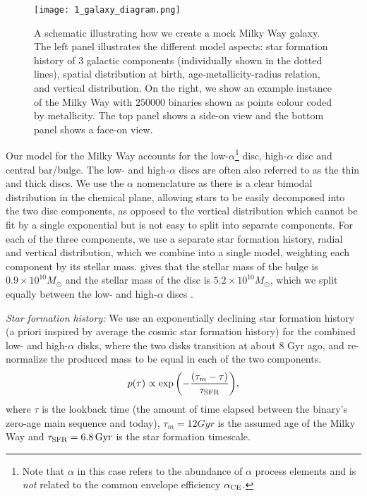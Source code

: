 \begin{figure*}[t]
    \centering
    \texttt{[image: 1\_galaxy\_diagram.png]}
    \caption{A schematic illustrating how we create a mock Milky Way galaxy. The left panel illustrates the different model aspects: star formation history of 3 galactic components (individually shown in the dotted lines), spatial distribution at birth, age-metallicity-radius relation, and vertical distribution.
    On the right, we show an example instance of the Milky Way with $250000$ binaries shown as points colour coded by metallicity. The top panel shows a side-on view and the bottom panel shows a face-on view.}
    \label{fig:galaxy_schematic}
\end{figure*}

Our model for the Milky Way accounts for the low-$\alpha$\footnote{Note that $\alpha$ in this case refers to the abundance of $\alpha$ process elements and is \textit{not} related to the common envelope efficiency $\alpha_{\rm CE}$.} disc, high-$\alpha$ disc and central bar/bulge. The low- and high-$\alpha$ discs are often also referred to as the thin and thick discs. We use the $\alpha$ nomenclature as there is a clear bimodal distribution in the chemical plane, allowing stars to be easily decomposed into the two disc components, as opposed to the vertical distribution which cannot be fit by a single exponential but is not easy to split into separate components. For each of the three components, we use a separate star formation history, radial and vertical distribution, which we combine into a single model, weighting each component by its stellar mass. \citet{Licquia+2015} gives that the stellar mass of the bulge is $0.9 \times 10^{10} \unit{M_{\odot}}$ and the stellar mass of the disc is $5.2 \times 10^{10} \unit{M_\odot}$, which we split equally between the low- and high-$\alpha$ discs \citep[e.g.,][]{Snaith+2014}.

\textit{Star formation history:} 
We use an exponentially declining star formation history \citep{Frankel+2018} (a priori inspired by average the cosmic star formation history) for the combined low- and high-$\alpha$ disks, where the two disks transition at about 8 Gyr ago, and re-normalize the produced mass to be equal in each of the two components.
\begin{equation}\label{eq:thin_disc_tau}
    p(\tau) \propto \exp \qty(-\frac{(\tau_m - \tau)}{\tau_{\rm SFR}}),
\end{equation}
where $\tau$ is the lookback time (the amount of time elapsed between the binary's zero-age main sequence and today), $\tau_m = 12 \unit{Gyr}$ is the assumed age of the Milky Way and $\tau_{\rm SFR} = 6.8 \unit{Gyr}$ is the star formation timescale. 

